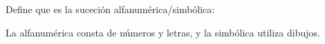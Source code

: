 
\question Define que es la suceción alfanumérica/simbólica:
  \begin{solution}[2cm]
    La alfanumérica consta de números y letras, y la simbólica utiliza
    dibujos.
  \end{solution}

